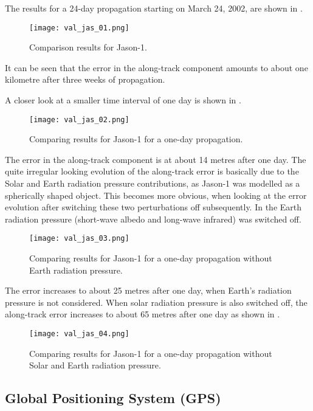 The results for a 24-day propagation starting on March 24, 2002, are shown in  .
\begin{figure}[!h]
 \centering
 \texttt{[image: val\_jas\_01.png]}
 \caption{Comparison results for Jason-1.\label{fig:val-jas-01}}
\end{figure}
It can be seen that the error in the along-track component amounts to about one kilometre after three weeks of propagation.

A closer look at a smaller time interval of one day is shown in  .
\begin{figure}[!h]
 \centering
 \texttt{[image: val\_jas\_02.png]}
 \caption{Comparing results for Jason-1 for a one-day propagation.\label{fig:val-jas-02}}
\end{figure}
The error in the along-track component is at about \num{14} metres after one day. The quite irregular looking evolution of the along-track error is basically due to 
the Solar and Earth radiation pressure contributions, as Jason-1 was modelled as a spherically shaped object. This becomes more obvious, when looking at the 
error evolution after switching these two perturbations off subsequently. In   the Earth radiation pressure (short-wave albedo and long-wave 
infrared) was switched off.
\begin{figure}[!h]
 \centering
 \texttt{[image: val\_jas\_03.png]}
 \caption{Comparing results for Jason-1 for a one-day propagation without Earth radiation pressure.\label{fig:val-jas-03}}
\end{figure}
The error increases to about 25 metres after one day, when Earth's radiation pressure is not considered. When solar radiation pressure is also switched off, 
the along-track error increases to about 65 metres after one day as shown in .
\begin{figure}[!h]
 \centering
 \texttt{[image: val\_jas\_04.png]}
 \caption{Comparing results for Jason-1 for a one-day propagation without Solar and Earth radiation pressure.\label{fig:val-jas-04}}
\end{figure}

\subsection{Global Positioning System (GPS)}

